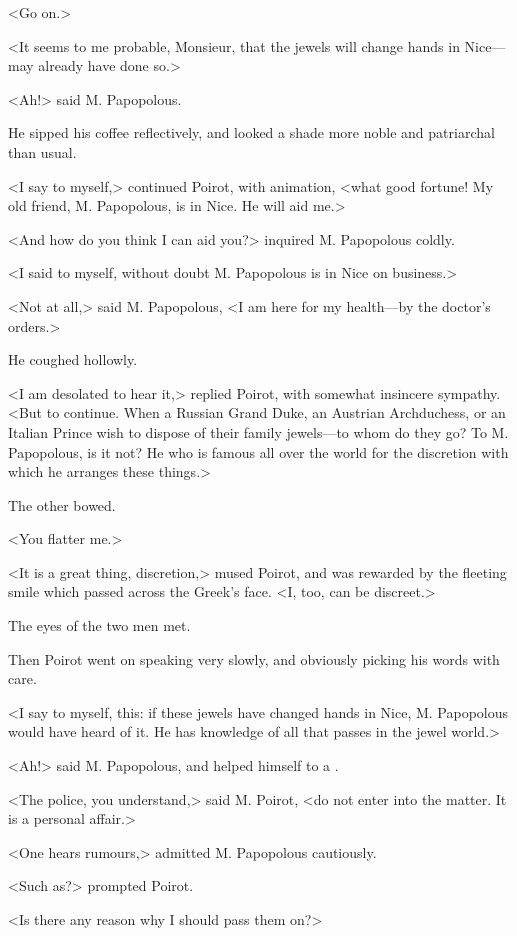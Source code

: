 <Go on.>

<It seems to me probable, Monsieur, that the jewels will change hands in Nice—may already have done so.>

<Ah!> said M. Papopolous.

He sipped his coffee reflectively, and looked a shade more noble and patriarchal than usual.

<I say to myself,> continued Poirot, with animation, <what good fortune! My old friend, M. Papopolous, is in Nice. He will aid me.>

<And how do you think I can aid you?> inquired M. Papopolous coldly.

<I said to myself, without doubt M. Papopolous is in Nice on business.>

<Not at all,> said M. Papopolous, <I am here for my health—by the doctor's orders.>

He coughed hollowly.

<I am desolated to hear it,> replied Poirot, with somewhat insincere sympathy. <But to continue. When a Russian Grand Duke, an Austrian Archduchess, or an Italian Prince wish to dispose of their family jewels—to whom do they go? To M. Papopolous, is it not? He who is famous all over the world for the discretion with which he arranges these things.>

The other bowed.

<You flatter me.>

<It is a great thing, discretion,> mused Poirot, and was rewarded by the fleeting smile which passed across the Greek's face. <I, too, can be discreet.>

The eyes of the two men met.

Then Poirot went on speaking very slowly, and obviously picking his words with care.

<I say to myself, this: if these jewels have changed hands in Nice, M. Papopolous would have heard of it. He has knowledge of all that passes in the jewel world.>

<Ah!> said M. Papopolous, and helped himself to a .

<The police, you understand,> said M. Poirot, <do not enter into the matter. It is a personal affair.>

<One hears rumours,> admitted M. Papopolous cautiously.

<Such as?> prompted Poirot.

<Is there any reason why I should pass them on?>

